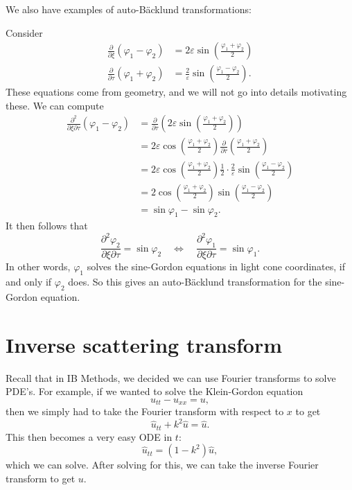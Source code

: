 \documentclass[a4paper]{article}
\begin{document}
We also have examples of auto-B\"acklund transformations:
\begin{eg}
  Consider
  \begin{align*}
    \frac{\partial}{\partial \xi}(\varphi_1 - \varphi_2) &= 2 \varepsilon \sin \left(\frac{\varphi_1 + \varphi_2}{2}\right)\\
    \frac{\partial}{\partial \tau}(\varphi_1 + \varphi_2) &= \frac{2}{\varepsilon} \sin\left(\frac{\varphi_1 - \varphi_2}{2}\right).
  \end{align*}
  These equations come from geometry, and we will not go into details motivating these. We can compute
  \begin{align*}
    \frac{\partial^2}{\partial \xi\partial \tau} (\varphi_1 - \varphi_2) &= \frac{\partial}{\partial \tau}\left(2\varepsilon \sin \left(\frac{\varphi_1 + \varphi_2}{2}\right)\right)\\
    &= 2\varepsilon \cos \left(\frac{\varphi_1 + \varphi_2}{2}\right)\frac{\partial}{\partial \tau}\left(\frac{\varphi_1 + \varphi_2}{2}\right)\\
    &= 2 \varepsilon \cos \left(\frac{\varphi_1 + \varphi_2}{2}\right) \frac{1}{2} \cdot \frac{2}{\varepsilon} \sin \left(\frac{\varphi_1 - \varphi_2}{2}\right)\\
    &= 2 \cos \left(\frac{\varphi_1 + \varphi_2}{2}\right)\sin \left(\frac{\varphi_1 - \varphi_2}{2}\right)\\
    &= \sin \varphi_1 - \sin \varphi_2.
  \end{align*}
  It then follows that
  \[
    \frac{\partial^2 \varphi_2}{\partial \xi \partial \tau} = \sin \varphi_2\quad\Longleftrightarrow\quad \frac{\partial^2 \varphi_1}{\partial \xi \partial \tau} = \sin \varphi_1.
  \]
  In other words, $\varphi_1$ solves the sine-Gordon equations in light cone coordinates, if and only if $\varphi_2$ does. So this gives an auto-B\"acklund transformation for the sine-Gordon equation.
\end{eg}


\section{Inverse scattering transform}
Recall that in IB Methods, we decided we can use Fourier transforms to solve PDE's. For example, if we wanted to solve the Klein-Gordon equation
\[
  u_{tt} - u_{xx} = u,
\]
then we simply had to take the Fourier transform with respect to $x$ to get
\[
  \hat{u}_{tt} + k^2 \hat{u} = \hat{u}.
\]
This then becomes a very easy ODE in $t$:
\[
  \hat{u}_{tt} = (1 - k^2) \hat{u},
\]
which we can solve. After solving for this, we can take the inverse Fourier transform to get $u$.
\end{document}
